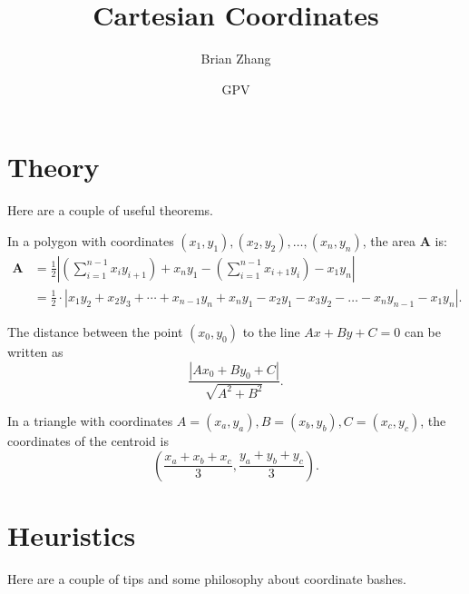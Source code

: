 \documentclass[mast]{lucky}
\title{Cartesian Coordinates}
\author{Brian Zhang}
\date{GPV}
\begin{document}
\maketitle
\section{Theory}

Here are a couple of useful theorems.

\begin{theo}[Shoelace]
In a polygon with coordinates $(x_1,y_1),(x_2,y_2),\dots,(x_n,y_n)$, the area $\mathbf{A}$ is:
\begin{align*}
    \mathbf{A} &= \frac{1}{2}\left|\left(\sum_{i=1}^{n-1}x_iy_{i+1}\right)+ x_ny_1-\left(\sum_{i=1}^{n-1}x_{i+1}y_i\right)-x_1y_n\right|\\ 
    &=\frac{1}{2}\cdot |x_1y_2+x_2y_3+\cdots + x_{n-1}y_n+x_ny_1-x_2y_1-x_3y_2-\dots-x_ny_{n-1}-x_1y_n|.
\end{align*}
\end{theo}

\begin{theo}
The distance between the point $(x_0,y_0)$ to the line $Ax+By+C=0$ can be written as 
\[\frac{|Ax_0+By_0+C|}{\sqrt{A^2+B^2}}.\]
\end{theo}

\begin{theo}
In a triangle with coordinates $A=(x_a,y_a),B=(x_b,y_b),C=(x_c,y_c)$, the coordinates of the centroid is
\[\left(\frac{x_a+x_b+x_c}{3},\frac{y_a+y_b+y_c}{3}\right).\]
\end{theo}

\section{Heuristics}

Here are a couple of tips and some philosophy about coordinate bashes.
\end{document}
